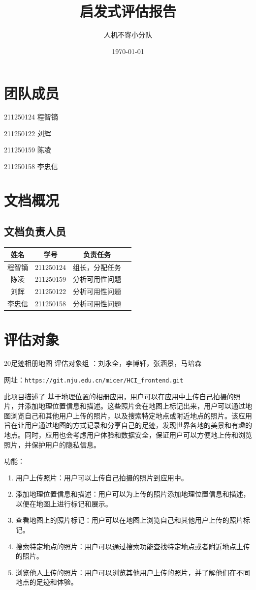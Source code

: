 \documentclass[a4paper,12pt]{article}
\title{启发式评估报告}
\author{人机不寄小分队}
\date{\today}
\begin{document}
\maketitle

\tableofcontents

\section{团队成员}
211250124 程智镝

211250122 刘辉

211250159 陈凌

211250158 李忠信

\section{文档概况}
\subsection{文档负责人员}
\begin{tabular}{|c|c|c|c|}
    \hline
    姓名   & 学号     & 负责任务   \\
    \hline
    程智镝 & 211250124& 组长，分配任务    \\
    陈凌 & 211250159& 分析可用性问题    \\
    刘辉 & 211250122& 分析可用性问题    \\
    李忠信 & 211250158& 分析可用性问题   \\
    \hline
\end{tabular}

\section{评估对象}
20足迹相册地图    
评估对象组 ：刘永全，李博轩，张涵景，马培森

网址：\verb|https://git.nju.edu.cn/micer/HCI_frontend.git|

此项目描述了 基于地理位置的相册应用，用户可以在应用中上传自己拍摄的照片，并添加地理位置信息和描述。这些照片会在地图上标记出来，用户可以通过地图浏览自己和其他用户上传的照片，以及搜索特定地点或附近地点的照片。该应用旨在让用户通过地图的方式记录和分享自己的足迹，发现世界各地的美景和有趣的地点。同时，应用也会考虑用户体验和数据安全，保证用户可以方便地上传和浏览照片，并保护用户的隐私信息。

功能：
\begin{enumerate}
    \item 用户上传照片：用户可以上传自己拍摄的照片到应用中。
    \item 添加地理位置信息和描述：用户可以为上传的照片添加地理位置信息和描述，以便在地图上进行标记和展示。
    \item 查看地图上的照片标记：用户可以在地图上浏览自己和其他用户上传的照片标记。
    \item 搜索特定地点的照片：用户可以通过搜索功能查找特定地点或者附近地点上传的照片。
    \item 浏览他人上传的照片：用户可以浏览其他用户上传的照片，并了解他们在不同地点的足迹和体验。
\end{enumerate}
\end{document}
